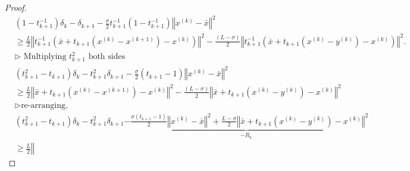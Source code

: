 \begin{proof}
        \begin{align}
            & (1-t_{k + 1}^{-1})\delta_k  - \delta_{k + 1} 
            -
            \frac{\sigma}{2}t^{-1}_{k + 1}\left(1 - t^{-1}_{k + 1}\right)
            \left\Vert 
                x^{(k)} - \bar x
            \right\Vert^2 
            \nonumber
            \\
            &\ge \frac{L}{2} \left\Vert
               t^{-1}_{k + 1}\left(
                \bar x + t_{k + 1} \left(
                    x^{(k)} - x^{(k + 1)}
                \right) - x^{(k)}
                \right)
            \right\Vert^2 - 
            \frac{(L - \sigma)}{2}
            \left\Vert
                t^{-1}_{k + 1}\left(
                    \bar x + t_{k + 1} \left(
                        x^{(k)} - y^{(k)}
                    \right) - x^{(k)}
                \right)
            \right\Vert^2. 
            \nonumber
            \\
            & \triangleright \text{ Multiplying $t_{k + 1}^2$ both sides} \nonumber
            \\
            & (t_{k + 1}^2 - t_{k + 1})\delta_k - t_{k + 1}^2\delta_{k + 1}
            - \frac{\sigma}{2}(t_{k + 1} - 1)
            \left\Vert
                x^{(k)} - \bar x
            \right\Vert^2 
            \nonumber
            \\
            &\ge 
            \frac{L}{2} \left\Vert
                \bar x + t_{k + 1} \left(
                    x^{(k)} - x^{(k + 1)}
                \right) - x^{(k)}
            \right\Vert^2 - 
            \frac{(L - \sigma)}{2}
            \left\Vert
                \bar x + t_{k + 1} \left(
                    x^{(k)} - y^{(k)}
                \right) - x^{(k)}
            \right\Vert^2
            \nonumber
            \\
            & \triangleright \text{re-arranging}, \nonumber
            \\
            & 
            (t_{k + 1}^2 - t_{k + 1})\delta_k - t_{k + 1}^2\delta_{k + 1} 
            \underbrace{
                - 
                \frac{\sigma(t_{k + 1} - 1)}{2}
                \left\Vert
                    x^{(k)} - \bar x
                \right\Vert^2 
                + 
                \frac{L - \sigma}{2}
                \left\Vert
                    \bar x + t_{k + 1}\left( x^{(k)} - y^{(k)}\right) - x^{(k)}
                \right\Vert^2
            }_{-R_k}
            \nonumber
            \\
            &\ge 
            \frac{L}{2}\left\Vert 

\end{align}
\end{proof}
